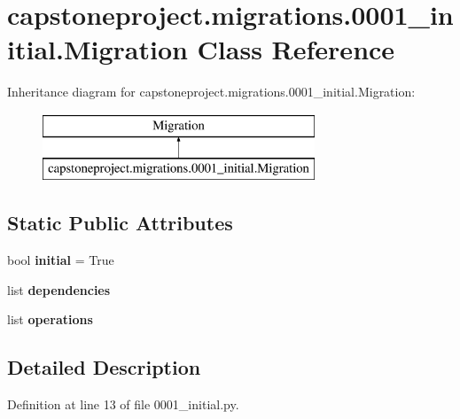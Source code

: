 \hypertarget{classcapstoneproject_1_1migrations_1_10001__initial_1_1_migration}{}\section{capstoneproject.\+migrations.0001\+\_\+initial.Migration Class Reference}
\label{classcapstoneproject_1_1migrations_1_10001__initial_1_1_migration}
Inheritance diagram for capstoneproject.\+migrations.0001\+\_\+initial.Migration\+:\begin{figure}[H]
\begin{center}
\leavevmode
\includegraphics[height=2.000000cm]{classcapstoneproject_1_1migrations_1_10001__initial_1_1_migration}
\end{center}
\end{figure}
\subsection*{Static Public Attributes}
\begin{DoxyCompactItemize}
\item 
\mbox{\label{classcapstoneproject_1_1migrations_1_10001__initial_1_1_migration_a4f9aa1f964f2e6b09c1b9bc5e89a4609}} 
bool {\bfseries initial} = True
\item 
list {\bfseries dependencies}
\item 
\mbox{\label{classcapstoneproject_1_1migrations_1_10001__initial_1_1_migration_a1a18e3c77785d9dd0b3462378101f204}} 
list {\bfseries operations}
\end{DoxyCompactItemize}


\subsection{Detailed Description}


Definition at line 13 of file 0001\+\_\+initial.\+py.



